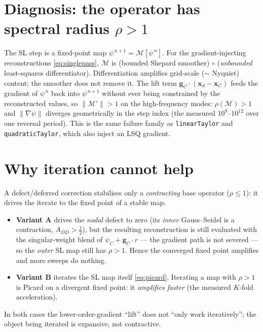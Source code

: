 \documentclass[11pt]{article}
\newcommand{\gradpsi}{\lVert\nabla\psi\rVert}
\newcommand{\code}[1]{\texttt{#1}}
\begin{document}
\section{Diagnosis: the operator has spectral radius $\rho>1$}
The SL step is a fixed-point map $\psi^{\,n+1}=\mathcal{M}[\psi^{\,n}]$. For the
gradient-injecting reconstructions \eqref{eq:singlepass}, $\mathcal{M}$ is
(bounded Shepard smoother) $\circ$ (\emph{unbounded} least-squares differentiator).
Differentiation amplifies grid-scale ($\sim$ Nyquist) content; the smoother does not
remove it. The lift term $\mathbf{g}_C\!\cdot(\mathbf{x}_d-\mathbf{x}_C)$ feeds the
gradient of $\psi^{\,n}$ back into $\psi^{\,n+1}$ without ever being constrained by
the reconstructed values, so $\lVert\mathcal{M}'\rVert>1$ on the high-frequency
modes: $\rho(\mathcal{M})>1$ and $\gradpsi$ diverges geometrically in the step index
(the measured $10^{9}$--$10^{12}$ over one reversal period). This is the same failure
family as \code{linearTaylor} and \code{quadraticTaylor}, which also inject an LSQ gradient.

\section{Why iteration cannot help}
A defect/deferred correction stabilises only a \emph{contracting} base operator
($\rho\le1$): it drives the iterate to the fixed point of a stable map.
\begin{itemize}
\item \textbf{Variant A} drives the \emph{nodal} defect to zero (its \emph{inner}
Gauss--Seidel is a contraction, $A_{DD}>\tfrac12$), but the resulting reconstruction
is still evaluated with the singular-weight blend of $\psi_C+\mathbf{g}_C\!\cdot r$
--- the gradient path is not severed --- so the \emph{outer} SL map still has
$\rho>1$. Hence the converged fixed point amplifies and more sweeps do nothing.
\item \textbf{Variant B} iterates the SL map itself \eqref{eq:picard}. Iterating a
map with $\rho>1$ is Picard on a divergent fixed point: it \emph{amplifies faster}
(the measured $K$-fold acceleration).
\end{itemize}
In both cases the lower-order-gradient ``lift'' does not ``only work iteratively'';
the object being iterated is expansive, not contractive.
\end{document}
